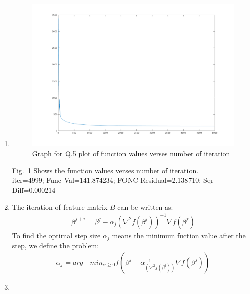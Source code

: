 \documentclass[12pt,twoside]{article}
\begin{document}
\begin{enumerate}[1)]
\item
\begin{figure}[tb]
\centering
\includegraphics[width = 1.0\hsize]{./figures/p2q5}
\caption{Graph for Q.5 plot of function values verses number of iteration}
\label{fig:p2q5 fig}
\end{figure}
Fig.~\ref{fig:p2q5 fig} Shows the function values verses number of iteration.\\
iter=4999; Func Val=141.874234; FONC Residual=2.138710; Sqr Diff=0.000214
\item
The iteration of feature matrix $B$ can be written as:
\begin{align}
\beta^{j+i} = \beta^j - \alpha_j (\nabla^2 f(\beta^j))^{-1} \nabla f(\beta^j)
\end{align}
To find the optimal step size $\alpha_j$ means the minimum fuction value after the step, we define the problem:
 \begin{align}
\alpha_j = arg\quad min_{\alpha\geq 0} f(\beta^j - \alpha_ (\nabla^2 f(\beta^j))^{-1} \nabla f(\beta^j))
\end{align}

\item

\end{enumerate}
\end{document}
